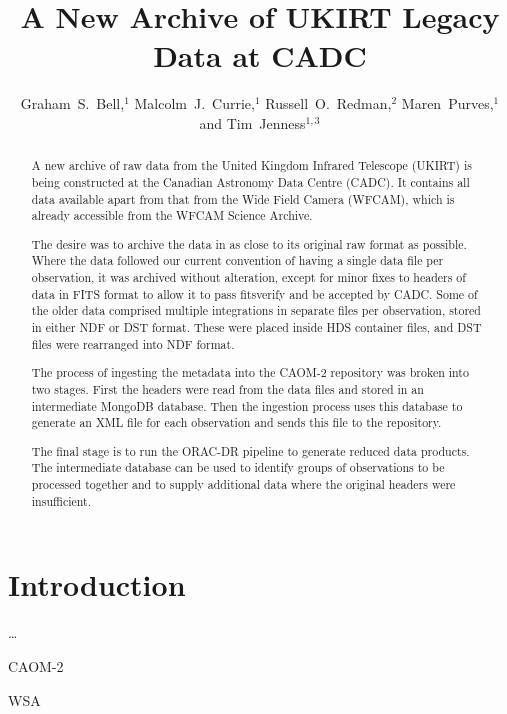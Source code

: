 \documentclass[11pt,twoside]{article}
\begin{document}
\title{A New Archive of UKIRT Legacy Data at CADC}
\author{Graham~S.~Bell,$^1$ Malcolm~J.~Currie,$^1$ Russell~O.~Redman,$^2$ Maren~Purves,$^1$ and Tim~Jenness$^{1,3}$
}

\begin{abstract}
A new archive of raw data from the United Kingdom Infrared
Telescope (UKIRT) is being constructed at the Canadian Astronomy
Data Centre (CADC).  It contains all data available apart from
that from the Wide Field Camera (WFCAM), which is already
accessible from the WFCAM Science Archive.

The desire was to archive the data in as close to its original raw
format as possible.  Where the data followed our current convention
of having a single data file per observation, it was archived
without alteration, except for minor fixes to headers of data in
FITS format to allow it to pass fitsverify and be accepted by CADC.
Some of the older data comprised multiple integrations in separate
files per observation, stored in either NDF or DST format. These
were placed inside HDS container files, and DST files were rearranged
into NDF format.

The process of ingesting the metadata into the CAOM-2 repository
was broken into two stages.  First the headers were read from
the data files and stored in an intermediate MongoDB database.
Then the ingestion process uses this database to generate an XML
file for each observation and sends this file to the repository.

The final stage is to run the ORAC-DR pipeline to generate reduced
data products.  The intermediate database can be used to identify
groups of observations to be processed together and to supply
additional data where the original headers were insufficient.
\end{abstract}

\section{Introduction}

\ldots

CAOM-2 \citep{2012ASPC..461..339D}

WSA \citep{2008MNRAS.384..637H}

\end{document}
